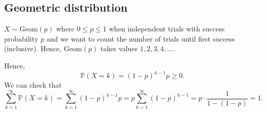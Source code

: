 \begin{explanation}
\begin{figure}[H]
    \end{figure}

\end{explanation}

\subsection{Geometric distribution}
\begin{definition}
    \(X \sim \mathrm{Geom}(p) \) where \(0 \le p \le 1\) when independent trials with success probability \(p\) and we want to count the number of trials until first success (inclusive). Hence, \(\mathrm{Geom}(p) \) takes values \(1, 2, 3, 4, \dots \).     
\end{definition}

Hence,
\[
    \mathbb{P} (X = k) = (1 - p)^{k-1} p \ge 0.
\]
We can check that 
\[
    \sum_{k=1}^{\infty} \mathbb{P} (X = k) = \sum_{k=1}^{\infty} (1 - p)^{k-1} p = p \sum_{k=1}^{\infty} (1-p)^{k-1} = p \cdot \frac{1}{1 - (1 - p)} = 1.  
\]